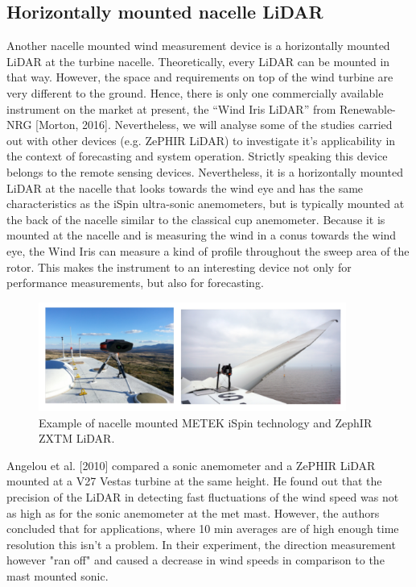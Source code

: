 \subsection{Horizontally mounted nacelle LiDAR}
{\color{blue}{needs attention - more authors: IW/AC ?}}

Another nacelle mounted wind measurement device is a horizontally mounted LiDAR at the turbine nacelle. Theoretically, every LiDAR can be mounted in that way. However, the space and requirements on top of the wind turbine are very different to the ground. Hence, there is only one commercially available instrument on the market at present, the “Wind Iris LiDAR” from Renewable-NRG [Morton, 2016]. Nevertheless, we will analyse some of the studies carried out with other devices (e.g. ZePHIR LiDAR) to investigate it's applicability in the context of forecasting and system operation. Strictly speaking this device belongs to the remote sensing devices. Nevertheless, it is a horizontally mounted LiDAR at the nacelle that looks towards the wind eye and has the same characteristics as the iSpin ultra-sonic anemometers, but is typically mounted at the back of the nacelle similar to the classical cup anemometer. 
Because it is mounted at the nacelle and is measuring the wind in a conus towards the wind eye, the Wind Iris can measure a kind of profile throughout the sweep area of the rotor. This makes the instrument to an interesting device not only for performance measurements, but also for forecasting.

\begin{figure}[h!]
\includegraphics[width=0.9\textwidth]{figures/nacelle_lidar.png}
\caption{Example of nacelle mounted METEK iSpin technology and ZephIR ZXTM LiDAR.}
\label{fig:ispinner}
\end{figure}


Angelou et al. [2010] compared a sonic anemometer and a ZePHIR LiDAR mounted at a V27 Vestas turbine at the same height. He found out that the precision of the LiDAR in detecting fast fluctuations of the wind speed was not as high as for the sonic anemometer at the met mast. However, the authors concluded that for applications, where 10 min averages are of high enough time resolution this isn't a problem. In their experiment, the direction measurement however "ran off" and caused a decrease in wind speeds in comparison to the mast mounted sonic. 

